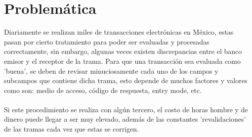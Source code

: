 \section{Problemática}
Diariamente se realizan miles de transacciones electrónicas en México, estas pasan por cierto tratamiento para poder ser evaluadas y procesadas correctamente, sin embargo, algunas veces existen discrepancias entre el banco emisor y el receptor de la trama. Para que una transacción sea evaluada como 'buena', se deben de revisar minuciosamente cada uno de los campos y subcampos que contiene dicha trama, esto depende de muchos factores y valores como son: medio de acceso, código de respuesta, entry mode, etc.
\\ \\
Si este procedimiento se realiza con algún tercero, el costo de horas hombre y de dinero puede llegar a ser muy elevado, además de las constantes 'revalidaciones' de las tramas cada vez que estas se corrigen.   